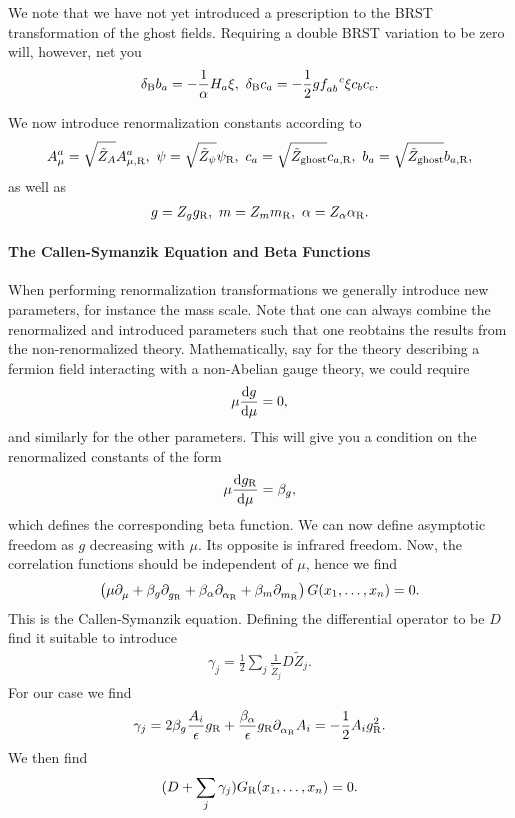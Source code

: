 We note that we have not yet introduced a prescription to the BRST transformation of the ghost fields. Requiring a double BRST variation to be zero will, however, net you
\begin{align*}
	\delta_{\text{B}}b_{a} = -\frac{1}{\alpha}H_{a}\xi,\ \delta_{\text{B}}c_{a} = -\frac{1}{2}g\srconst{ab}{c}\xi c_{b}c_{c}.
\end{align*}

We now introduce renormalization constants according to
\begin{align*}
	A_{\mu}^{a} = \sqrt{\tilde{Z}_{A}}A_{\mu, \text{R}}^{a},\ \psi = \sqrt{\tilde{Z}_{\psi}}\psi_{\text{R}},\ c_{a} = \sqrt{\tilde{Z}_{\text{ghost}}}c_{a, \text{R}},\ b_{a} = \sqrt{\tilde{Z}_{\text{ghost}}}b_{a, \text{R}},
\end{align*}
as well as 
\begin{align*}
	g = Z_{g}g_{\text{R}},\ m = Z_{m}m_{\text{R}},\ \alpha = Z_{\alpha}\alpha_{\text{R}}.
\end{align*}

\paragraph{The Callen-Symanzik Equation and Beta Functions}
When performing renormalization transformations we generally introduce new parameters, for instance the mass scale. Note that one can always combine the renormalized and introduced parameters such that one reobtains the results from the non-renormalized theory. Mathematically, say for the theory describing a fermion field interacting with a non-Abelian gauge theory, we could require
\begin{align*}
	\mu\dv{g}{\mu} = 0,
\end{align*}
and similarly for the other parameters. This will give you a condition on the renormalized constants of the form
\begin{align*}
	\mu\dv{g_{\ensuremath{\text{R}}}}{\mu} = \beta_{g},
\end{align*}
which defines the corresponding beta function. We can now define asymptotic freedom as $g$ decreasing with $\mu$. Its opposite is infrared freedom. Now, the correlation functions should be independent of $\mu$, hence we find
\begin{align*}
	\left(\mu\partial^{}_{\mu} + \beta_{g}\partial^{}_{g_{\text{R}}} + \beta_{\alpha}\partial^{}_{\alpha_{\text{R}}} + \beta_{m}\partial^{}_{m_{\text{R}}} \right)G(x_{1}, \dots, x_{n}) = 0.
\end{align*}
This is the Callen-Symanzik equation. Defining the differential operator to be $D$ find it suitable to introduce
\begin{align*}
	\gamma_{j} = \frac{1}{2}\sum\limits_{j}\frac{1}{\tilde{Z}_{j}}D\tilde{Z}_{j}.
\end{align*}
For our case we find
\begin{align*}
	\gamma_{j} = 2\beta_{g}\frac{A_{i}}{\epsilon}g_{\text{R}} + \frac{\beta_{\alpha}}{\epsilon}g_{\text{R}}\partial^{}_{\alpha_{\text{R}}}A_{i} = -\frac{1}{2}A_{i}g_{\text{R}}^{2}.
\end{align*}
We then find
\begin{align*}
	(D + \sum\limits_{j}\gamma_{j})G_{\text{R}}(x_{1}, \dots, x_{n}) = 0.
\end{align*}